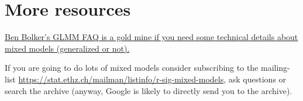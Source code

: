 \documentclass[12pt,a4paper]{scrartcl}\usepackage[]{graphicx}\usepackage[]{color}
\begin{document}
\section{}


\begin{Exercise}[difficulty=1, title={xxx}]

\end{Exercise}
\begin{Answer}

\end{Answer}

\section{More resources}


\href{http://bbolker.github.io/mixedmodels-misc/glmmFAQ.html}{Ben Bolker's GLMM FAQ is a gold mine if you need some technical details about mixed models (generalized or not).}

If you are going to do lots of mixed models consider subscribing to the mailing-list \href{https://stat.ethz.ch/mailman/listinfo/r-sig-mixed-models}{https://stat.ethz.ch/mailman/listinfo/r-sig-mixed-models}, ask questions or search the archive (anyway, Google is likely to directly send you to the archive).
\end{document}

